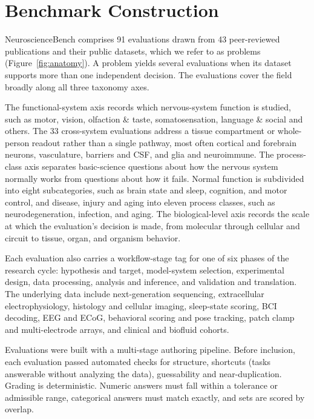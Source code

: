 \section*{Benchmark Construction}
NeuroscienceBench comprises 91 evaluations drawn from 43 peer-reviewed publications and their public datasets, which we refer to as problems (Figure~\ref{fig:anatomy}). A problem yields several evaluations when its dataset supports more than one independent decision. The evaluations cover the field broadly along all three taxonomy axes.

The functional-system axis records which nervous-system function is studied, such as motor, vision, olfaction \& taste, somatosensation, language \& social and others. The 33 cross-system evaluations address a tissue compartment or whole-person readout rather than a single pathway, most often cortical and forebrain neurons, vasculature, barriers and CSF, and glia and neuroimmune. The process-class axis separates basic-science questions about how the nervous system normally works from questions about how it fails.  Normal function is subdivided into eight subcategories, such as brain state and sleep, cognition, and motor control, and disease, injury and aging into eleven process classes, such as neurodegeneration, infection, and aging. The biological-level axis records the scale at which the evaluation's decision is made, from molecular through cellular and circuit to tissue, organ, and organism behavior.

Each evaluation also carries a workflow-stage tag for one of six phases of the research cycle: hypothesis and target, model-system selection, experimental design, data processing, analysis and inference, and validation and translation.  The underlying data include next-generation sequencing, extracellular electrophysiology, histology and cellular imaging, sleep-state scoring, BCI decoding, EEG and ECoG, behavioral scoring and pose tracking, patch clamp and multi-electrode arrays, and clinical and biofluid cohorts.

Evaluations were built with a multi-stage authoring pipeline. Before inclusion, each evaluation passed automated checks for structure, shortcuts (tasks answerable without analyzing the data), guessability and near-duplication. Grading is deterministic. Numeric answers must fall within a tolerance or admissible range, categorical answers must match exactly, and sets are scored by overlap.
